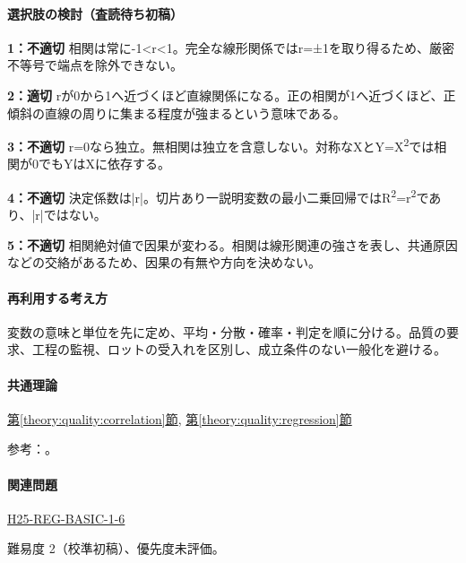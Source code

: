 \paragraph{選択肢の検討（査読待ち初稿）}\mbox{}\par

\noindent\textbf{1：不適切} 相関は常に-1<r<1。完全な線形関係ではr=±1を取り得るため、厳密不等号で端点を除外できない。\par

\noindent\textbf{2：適切} rが0から1へ近づくほど直線関係になる。正の相関が1へ近づくほど、正傾斜の直線の周りに集まる程度が強まるという意味である。\par

\noindent\textbf{3：不適切} r=\allowbreak{}0なら独立。無相関は独立を含意しない。対称なXとY=\allowbreak{}X\textsuperscript{2}では相関が0でもYはXに依存する。\par

\noindent\textbf{4：不適切} 決定係数は|r|。切片あり一説明変数の最小二乗回帰ではR\textsuperscript{2}=r\textsuperscript{2}であり、|r|ではない。\par

\noindent\textbf{5：不適切} 相関絶対値で因果が変わる。相関は線形関連の強さを表し、共通原因などの交絡があるため、因果の有無や方向を決めない。\par

\paragraph{再利用する考え方} 変数の意味と単位を先に定め、平均・分散・確率・判定を順に分ける。品質の要求、工程の監視、ロットの受入れを区別し、成立条件のない一般化を避ける。

\paragraph{共通理論} \hyperref[theory:quality:correlation]{第\ref*{theory:quality:correlation}節}, \hyperref[theory:quality:regression]{第\ref*{theory:quality:regression}節}

\par 参考：\cite{stat_psu_correlation}。

\paragraph{関連問題} \hyperref[q:h25-reg-basic-1-6]{H25-REG-BASIC-1-6}

\par 難易度 2（校準初稿）、優先度未評価。

